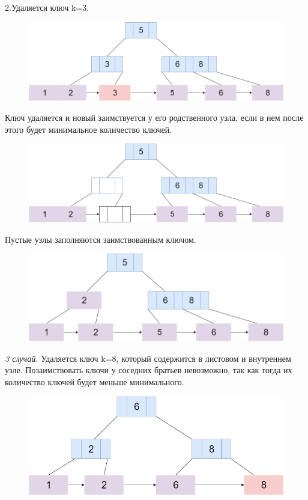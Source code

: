 \documentclass{article}
\begin{document}
2.Удаляется ключ k=3.
\begin{figure}
\includegraphics[scale=0.4]{dell111.png}

\caption{}
\end{figure}


Ключ удаляется и новый заимствуется у его родственного узла, если в нем после этого будет минимальное количество ключей.
\begin{figure}
\includegraphics[scale=0.4]{dell222.png}

\caption{}
\end{figure}


Пустые узлы заполняются заимствованным ключом.
\begin{figure}
\includegraphics[scale=0.4]{dell333.png}

\caption{}
\end{figure}


\textit{3 случай.} Удаляется ключ k=8, который содержится в листовом и внутреннем узле. Позаимствовать ключи у соседних братьев невозможно, так как тогда их количество ключей будет меньше минимального. 
\begin{figure}
\includegraphics[scale=0.4]{ddel1.png}

\caption{}
\end{figure}
\end{document}
